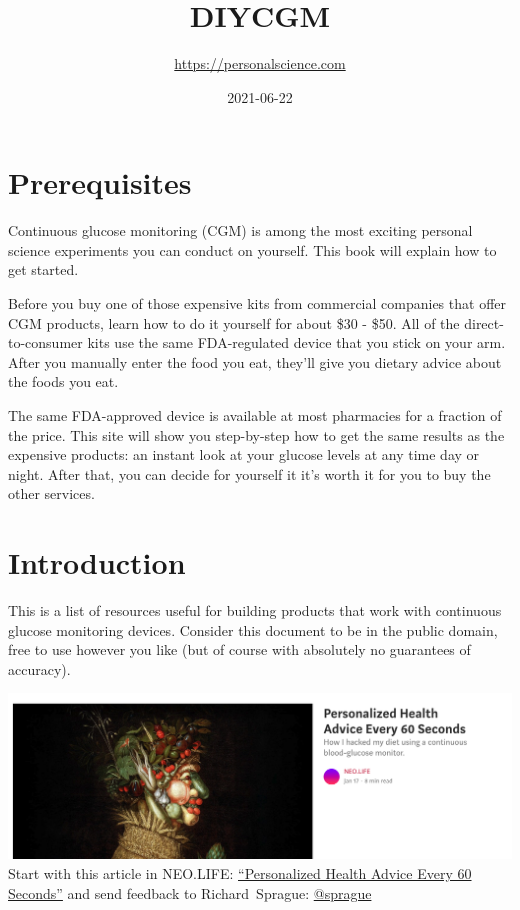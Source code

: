 \documentclass[
]{book}
\title{DIYCGM}
\author{\url{https://personalscience.com}}
\date{2021-06-22}
\begin{document}
\maketitle

{
\setcounter{tocdepth}{1}
\tableofcontents
}
\hypertarget{prerequisites}{%
\chapter{Prerequisites}\label{prerequisites}}

Continuous glucose monitoring (CGM) is among the most exciting personal science experiments you can conduct on yourself. This book will explain how to get started.

Before you buy one of those expensive kits from commercial companies that offer CGM products, learn how to do it yourself for about \$30 - \$50. All of the direct-to-consumer kits use the same FDA-regulated device that you stick on your arm. After you manually enter the food you eat, they'll give you dietary advice about the foods you eat.

The same FDA-approved device is available at most pharmacies for a fraction of the price. This site will show you step-by-step how to get the same results as the expensive products: an instant look at your glucose levels at any time day or night. After that, you can decide for yourself it it's worth it for you to buy the other services.

\hypertarget{intro}{%
\chapter{Introduction}\label{intro}}

This is a list of resources useful for building products that work with continuous glucose monitoring devices. Consider this document to be in the public domain, free to use however you like (but of course with absolutely no guarantees of accuracy).

\includegraphics{images/sprague-neolife.png}
Start with this article in NEO.LIFE: \href{https://neo.life/2019/01/personalized-health-advice-every-60-seconds/}{``Personalized Health Advice Every 60 Seconds''} and send feedback to Richard~Sprague: \href{https://twitter.com/sprague}{@sprague}
\end{document}

